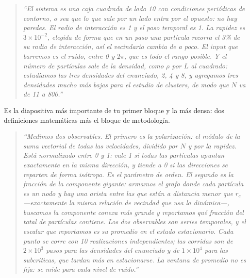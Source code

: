 \documentclass[11pt]{article}
\begin{document}
\begin{quote}
\itshape
``El sistema es una caja cuadrada de lado 10 con condiciones periódicas de
contorno, o sea que lo que sale por un lado entra por el opuesto: no hay
paredes. El radio de interacción es 1 y el paso temporal es 1. La rapidez es
$3 \times 10^{-2}$, elegida de forma que en un paso una partícula recorra el
3\% de su radio de interacción, así el vecindario cambia de a poco. El input que
barremos es el ruido, entre 0 y $2\pi$, que es todo el rango posible. Y el
número de partículas sale de la densidad, como $\rho$ por $L$ al cuadrado:
estudiamos las tres densidades del enunciado, 2, 4 y 8, y agregamos tres
densidades mucho más bajas para el estudio de clusters, de modo que $N$ va de 11
a 800.''
\end{quote}



Es la diapositiva más importante de tu primer bloque y la más densa: dos
definiciones matemáticas más el bloque de metodología.

\begin{quote}
\itshape
``Medimos dos observables. El primero es la polarización: el módulo de la suma
vectorial de todas las velocidades, dividido por $N$ y por la rapidez. Está
normalizado entre 0 y 1: vale 1 si todas las partículas apuntan exactamente en
la misma dirección, y tiende a 0 si las direcciones se reparten de forma
isótropa. Es el parámetro de orden. El segundo es la fracción de la componente
gigante: armamos el grafo donde cada partícula es un nodo y hay una arista entre
las que están a distancia menor que $r_c$ ---exactamente la misma relación de
vecindad que usa la dinámica---, buscamos la componente conexa más grande y
reportamos qué fracción del total de partículas contiene. Los dos observables
son series temporales, y el escalar que reportamos es su promedio en el estado
estacionario. Cada punto se corre con 10 realizaciones independientes; las
corridas son de $2 \times 10^3$ pasos para las densidades del enunciado y de
$1 \times 10^4$ para las subcríticas, que tardan más en estacionarse. La ventana
de promedio no es fija: se mide para cada nivel de ruido.''
\end{quote}
\end{document}
